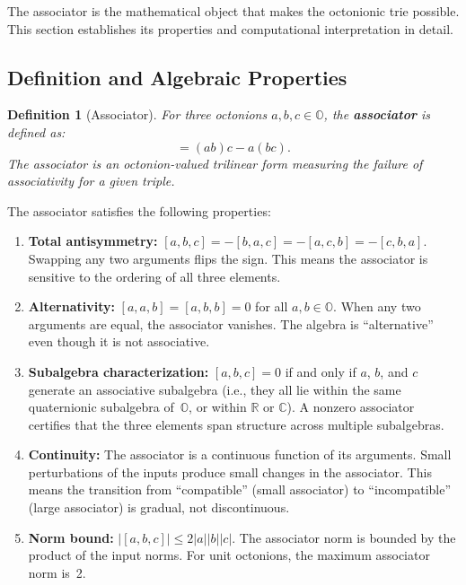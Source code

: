 \documentclass[11pt,a4paper]{article}
\newtheorem{definition}[theorem]{Definition}
\theoremstyle{definition}
\theoremstyle{remark}
\newcommand{\Oct}{\mathbb{O}}
\newcommand{\Real}{\mathbb{R}}
\newcommand{\Comp}{\mathbb{C}}
\begin{document}
The associator is the mathematical object that makes the octonionic trie possible. This section establishes its properties and computational interpretation in detail.

\subsection{Definition and Algebraic Properties}

\begin{definition}[Associator]
For three octonions $a, b, c \in \Oct$, the \textbf{associator} is defined as:
\begin{equation}
  [a, b, c] = (ab)c - a(bc).
\end{equation}
The associator is an octonion-valued trilinear form measuring the failure of associativity for a given triple.
\end{definition}

The associator satisfies the following properties:

\begin{enumerate}[nosep]
  \item \textbf{Total antisymmetry:} $[a,b,c] = -[b,a,c] = -[a,c,b] = -[c,b,a]$. Swapping any two arguments flips the sign. This means the associator is sensitive to the ordering of all three elements.

  \item \textbf{Alternativity:} $[a,a,b] = [a,b,b] = 0$ for all $a, b \in \Oct$. When any two arguments are equal, the associator vanishes. The algebra is ``alternative'' even though it is not associative.

  \item \textbf{Subalgebra characterization:} $[a,b,c] = 0$ if and only if $a$, $b$, and $c$ generate an associative subalgebra (i.e., they all lie within the same quaternionic subalgebra of~$\Oct$, or within $\Real$ or $\Comp$). A nonzero associator certifies that the three elements span structure across multiple subalgebras.

  \item \textbf{Continuity:} The associator is a continuous function of its arguments. Small perturbations of the inputs produce small changes in the associator. This means the transition from ``compatible'' (small associator) to ``incompatible'' (large associator) is gradual, not discontinuous.

  \item \textbf{Norm bound:} $\lvert [a,b,c] \rvert \leq 2\lvert a \rvert \lvert b \rvert \lvert c \rvert$. The associator norm is bounded by the product of the input norms. For unit octonions, the maximum associator norm is~2.
\end{enumerate}
\end{document}
